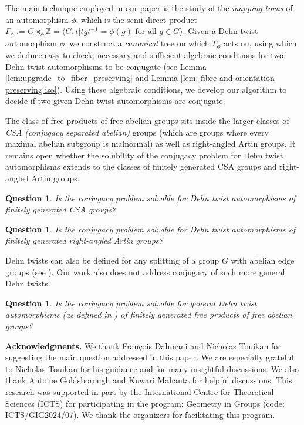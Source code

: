 \documentclass{amsart}
\newcommand{\Z}{\mathbb{Z}}
\theoremstyle{plain}
\newtheorem{qu}[thm]{Question}
\theoremstyle{definition}
\theoremstyle{remark}
\begin{document}
The main technique employed in our paper is the study of the \emph{mapping torus} of an automorphism $\phi$, which is the semi-direct product $\Gamma_{\phi} := G \rtimes_{\phi} \Z = \langle G, t \vert tgt^{-1} = \phi(g) \text{ for all } g \in G \rangle$. Given a Dehn twist automorphism $\phi$, we construct a \emph{canonical} tree on which $\Gamma_{\phi}$ acts on, using which we deduce easy to check, necessary and sufficient algebraic conditions for two Dehn twist automorphisms to be conjugate (see Lemma \ref{lem:upgrade_to_fiber_preserving} and Lemma \ref{lem: fibre and orientation preserving iso}). Using these algebraic conditions, we develop our algorithm to decide if two given Dehn twist automorphisms are conjugate. 

The class of free products of free abelian groups sits inside the larger classes of \emph{CSA (conjugacy separated abelian)} groups (which are groups where every maximal abelian subgroup is malnormal) as well as right-angled Artin groups. It remains open whether the solubility of the conjugacy problem for Dehn twist automorphisms extends to the classes of finitely generated CSA groups and right-angled Artin groups. 

\begin{qu}
    Is the conjugacy problem solvable for Dehn twist automorphisms of finitely generated CSA groups? 
\end{qu}
\begin{qu}
    Is the conjugacy problem solvable for Dehn twist automorphisms of finitely generated right-angled Artin groups? 
\end{qu}

Dehn twists can also be defined for any splitting of a group $G$ with abelian edge groups (see \cite[Definition 5.1]{Cohen_Lustig}). Our work also does not address conjugacy of such more general Dehn twists. 
\begin{qu}
    Is the conjugacy problem solvable for general Dehn twist automorphisms (as defined in \cite[Definition 5.1]{Cohen_Lustig}) of finitely generated free products of free abelian groups? 
\end{qu}

\textbf{Acknowledgments.}
We thank François Dahmani and Nicholas Touikan for suggesting the main question addressed in this paper. We are especially grateful to Nicholas Touikan for his guidance and for many insightful discussions. We also thank Antoine Goldsborough and Kuwari Mahanta for helpful discussions. This research was supported in part by the International Centre for Theoretical Sciences (ICTS) for participating in the program: Geometry in Groups (code: ICTS/GIG2024/07). We thank the organizers for facilitating this program.
\end{document}
